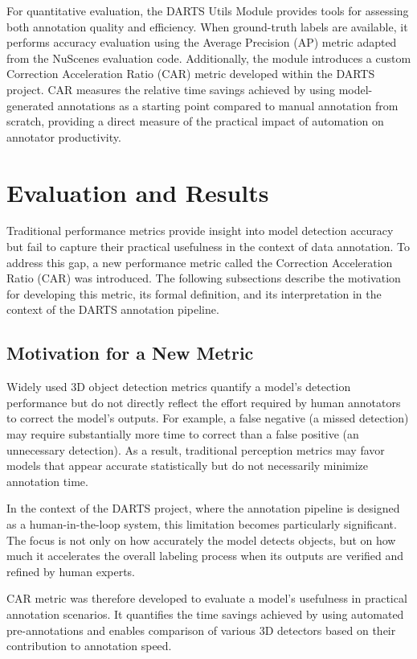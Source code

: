 \documentclass[conference]{IEEEtran}
\begin{document}
For quantitative evaluation, the DARTS Utils Module provides tools for assessing both annotation quality and efficiency. When ground-truth labels are available, it performs accuracy evaluation using the Average Precision (AP) metric adapted from the NuScenes evaluation code. Additionally, the module introduces a custom Correction Acceleration Ratio (CAR) metric developed within the DARTS project. CAR measures the relative time savings achieved by using model-generated annotations as a starting point compared to manual annotation from scratch, providing a direct measure of the practical impact of automation on annotator productivity.
\section{Evaluation and Results}

Traditional performance metrics provide insight into model detection accuracy but fail to capture their practical usefulness in the context of data annotation. To address this gap, a new performance metric called the Correction Acceleration Ratio (CAR) was introduced. The following subsections describe the motivation for developing this metric, its formal definition, and its interpretation in the context of the DARTS annotation pipeline.

\subsection{Motivation for a New Metric}

Widely used 3D object detection metrics quantify a model’s detection performance but do not directly reflect the effort required by human annotators to correct the model’s outputs. For example, a false negative (a missed detection) may require substantially more time to correct than a false positive (an unnecessary detection). As a result, traditional perception metrics may favor models that appear accurate statistically but do not necessarily minimize annotation time.

In the context of the DARTS project, where the annotation pipeline is designed as a human-in-the-loop system, this limitation becomes particularly significant. The focus is not only on how accurately the model detects objects, but on how much it accelerates the overall labeling process when its outputs are verified and refined by human experts.

CAR metric was therefore developed to evaluate a model’s usefulness in practical annotation scenarios. It quantifies the time savings achieved by using automated pre-annotations and enables comparison of various 3D detectors based on their contribution to annotation speed.
\end{document}
